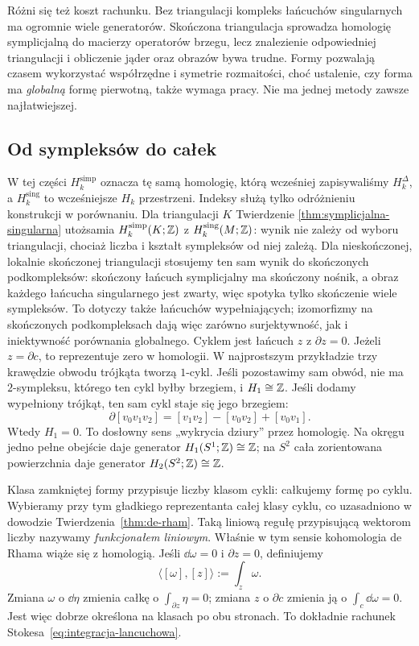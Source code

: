 Różni się też koszt rachunku. Bez triangulacji
kompleks łańcuchów singularnych ma ogromnie
wiele generatorów. Skończona triangulacja
sprowadza homologię symplicjalną do macierzy
operatorów brzegu, lecz znalezienie odpowiedniej
triangulacji i obliczenie jąder oraz obrazów
bywa trudne. Formy pozwalają czasem wykorzystać
współrzędne i symetrie rozmaitości, choć
ustalenie, czy forma ma \emph{globalną}
formę pierwotną, także wymaga pracy.
Nie ma jednej metody zawsze najłatwiejszej.

\subsection*{Od sympleksów do całek}

W tej części $H_k^{\mathrm{simp}}$ oznacza tę samą homologię,
którą wcześniej zapisywaliśmy $H_k^\Delta$, a
$H_k^{\mathrm{sing}}$ to wcześniejsze $H_k$ przestrzeni.
Indeksy służą tylko odróżnieniu konstrukcji w porównaniu.
Dla triangulacji $K$ Twierdzenie
\ref{thm:symplicjalna-singularna} utożsamia
$H_k^{\mathrm{simp}}(K;\mathbb{Z})$ z
$H_k^{\mathrm{sing}}(M;\mathbb{Z})$: wynik nie zależy
od wyboru triangulacji, chociaż liczba i kształt
sympleksów od niej zależą. Dla nieskończonej, lokalnie
skończonej triangulacji stosujemy ten sam wynik do skończonych
podkompleksów: skończony łańcuch symplicjalny ma skończony
nośnik, a obraz każdego łańcucha singularnego jest zwarty,
więc spotyka tylko skończenie wiele sympleksów.
To dotyczy także łańcuchów wypełniających; izomorfizmy
na skończonych podkompleksach dają więc zarówno
surjektywność, jak i iniektywność porównania globalnego.
Cyklem jest łańcuch
$z$ z $\partial z=0$. Jeżeli $z=\partial c$,
to reprezentuje zero w homologii.
W najprostszym przykładzie trzy krawędzie
obwodu trójkąta tworzą $1$-cykl. Jeśli
pozostawimy sam obwód, nie ma $2$-sympleksu,
którego ten cykl byłby brzegiem, i
$H_1\cong\mathbb{Z}$. Jeśli dodamy wypełniony trójkąt,
ten sam cykl staje się jego brzegiem:
\[
 \partial[v_0v_1v_2]
 =[v_1v_2]-[v_0v_2]+[v_0v_1].
\]
Wtedy $H_1=0$. To dosłowny sens
„wykrycia dziury” przez homologię.
Na okręgu
jedno pełne obejście daje generator $H_1(S^1;\mathbb{Z})
\cong\mathbb{Z}$; na $S^2$ cała zorientowana powierzchnia
daje generator $H_2(S^2;\mathbb{Z})\cong\mathbb{Z}$.

Klasa zamkniętej formy przypisuje liczby
klasom cykli: całkujemy formę po cyklu.
Wybieramy przy tym gładkiego reprezentanta całej klasy
cyklu, co uzasadniono w dowodzie Twierdzenia~\ref{thm:de-rham}.
Taką liniową regułę przypisującą wektorom
liczby nazywamy \emph{funkcjonałem liniowym}.
Właśnie w tym sensie kohomologia de Rhama
wiąże się z homologią. Jeśli
$\dd\omega=0$ i $\partial z=0$, definiujemy
\begin{equation}\label{eq:parowanie-de-rham-homologia}
 \langle[\omega],[z]\rangle:=\int_z\omega.
\end{equation}
Zmiana $\omega$ o $\dd\eta$ zmienia całkę o
$\int_{\partial z}\eta=0$; zmiana $z$ o
$\partial c$ zmienia ją o
$\int_c\dd\omega=0$. Jest więc dobrze określona
na klasach po obu stronach. To dokładnie
rachunek Stokesa~\eqref{eq:integracja-lancuchowa}.

